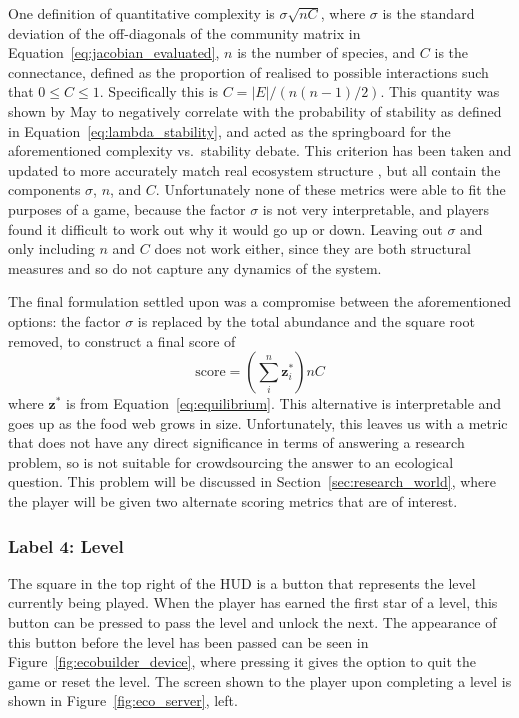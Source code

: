 One definition of quantitative complexity is $\sigma\sqrt{nC}$, where $\sigma$ is the standard deviation of the off-diagonals of the community matrix in Equation~\ref{eq:jacobian_evaluated}, $n$ is the number of species, and $C$ is the connectance, defined as the proportion of realised to possible interactions such that $0\leq C\leq1$. Specifically this is $C=|E| / (n(n-1)/2)$. This quantity was shown by May to negatively correlate with the probability of stability as defined in Equation~\eqref{eq:lambda_stability}, and acted as the springboard for the aforementioned complexity vs.\ stability debate.
This criterion has been taken and updated to more accurately match real ecosystem structure \citep{Allesina2012, Tang2014Correlation}, but all contain the components $\sigma$, $n$, and $C$.
Unfortunately none of these metrics were able to fit the purposes of a game, because the factor $\sigma$ is not very interpretable, and players found it difficult to work out why it would go up or down.
Leaving out $\sigma$ and only including $n$ and $C$ does not work either, since they are both structural measures and so do not capture any dynamics of the system.

The final formulation settled upon was a compromise between the aforementioned options: the factor $\sigma$ is replaced by the total abundance and the square root removed, to construct a final score of
\begin{equation}
  \mathrm{score} = \left(\sum^n_i\mathbf{z}^*_i\right)nC
  \label{eq:score}
\end{equation}
where $\mathbf{z^*}$ is from Equation~\eqref{eq:equilibrium}. This alternative is interpretable and goes up as the food web grows in size.
Unfortunately, this leaves us with a metric that does not have any direct significance in terms of answering a research problem, so is not suitable for crowdsourcing the answer to an ecological question. This problem will be discussed in Section~\ref{sec:research_world}, where the player will be given two alternate scoring metrics that are of interest.

\subsubsection{Label 4: Level}
The square in the top right of the HUD is a button that represents the level currently being played. When the player has earned the first star of a level, this button can be pressed to pass the level and unlock the next. The appearance of this button before the level has been passed can be seen in Figure~\ref{fig:ecobuilder_device}, where pressing it gives the option to quit the game or reset the level. The screen shown to the player upon completing a level is shown in Figure~\ref{fig:eco_server}, left.

